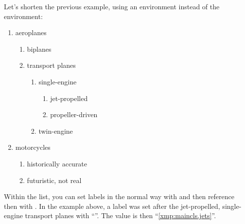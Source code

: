     \begin{Example}
      Let's shorten the previous example, using an 
       environment instead of the
       environment:
      \begin{ShowOutput}[\baselineskip]
        \begin{enumerate}
        \item aeroplanes
          \begin{enumerate}
          \item biplanes
          \item transport planes
            \begin{enumerate}
            \item single-engine
              \begin{enumerate}
              \item jet-propelled\label{xmp:maincls.jets}
              \item propeller-driven
              \end{enumerate}
            \item twin-engine
            \end{enumerate}
          \end{enumerate}
          \item motorcycles
          \begin{enumerate}
             \item historically accurate
             \item futuristic, not real
          \end{enumerate}
        \end{enumerate}
      \end{ShowOutput}
      Within the list, you can set labels in the normal way with 
       and then reference then with .
      In the example above, a label was set after the jet-propelled,
      single-engine transport planes with
      ``''. The  value is then
      ``\ref{xmp:maincls.jets}''.
    \end{Example}
  \fi%
  \EndIndexGroup


